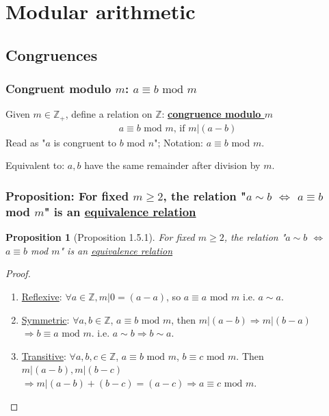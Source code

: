 \documentclass[11pt,a4paper]{article}
\newtheorem{proposition}{Proposition}
\begin{document}
\section{Modular arithmetic}
\subsection{Congruences}
\subsubsection{Congruent modulo $m$: $a\equiv b \text{ mod }m$}
Given $m\in\mathbb{Z}_+$, define a relation on $\mathbb{Z}$: \underline{\textbf{congruence modulo $m$}}
\begin{equation}
    \begin{aligned}
        a\equiv b \text{ mod }m\text{, if } m|(a-b)
    \end{aligned}
    \nonumber
\end{equation}
Read as "$a$ is congruent to $b$ mod $n$"; Notation: $a\equiv b$ mod $m$.

Equivalent to: $a,b$ have the same remainder after division by $m$.
\subsubsection{Proposition: For fixed $m\geq 2$, the relation "$a\sim b$ $\Leftrightarrow$ $a\equiv b$ mod $m$" is an \underline{equivalence relation}}
\begin{proposition}[Proposition 1.5.1]
    For fixed $m\geq 2$, the relation "$a\sim b$ $\Leftrightarrow$ $a\equiv b$ mod $m$" is an \underline{equivalence relation}
\end{proposition}
\begin{proof}
\quad

\begin{enumerate}[1)]
    \item \underline{Reflexive}: $\forall a\in\mathbb{Z}, m|0=(a-a)$, so $a\equiv a \text{ mod }m$ i.e. $a\sim a$.
    \item \underline{Symmetric}: $\forall a,b\in\mathbb{Z}$, $a\equiv b \text{ mod }m$, then $m|(a-b)\Rightarrow m|(b-a)$$\Rightarrow b\equiv a \text{ mod }m$. i.e. $a\sim b \Rightarrow b\sim a$.
    \item \underline{Transitive}: $\forall a,b,c\in\mathbb{Z}$, $a\equiv b \text{ mod }m$, $b\equiv c \text{ mod }m$. Then $m|(a-b), m|(b-c)$ $\Rightarrow m|(a-b)+(b-c)=(a-c)\Rightarrow a\equiv c \text{ mod }m$.
\end{enumerate}
\end{proof}
\end{document}
